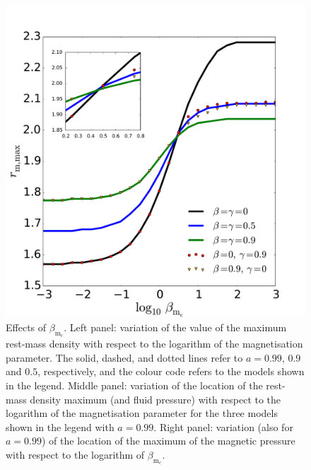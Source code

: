 \documentclass{aa}
\begin{document}
\begin{figure}
\hspace{-0.2cm}
\includegraphics[scale=0.14]{figures/fig6c.pdf}
\caption{Effects of $\beta_{\mathrm{m}_{\mathrm{c}}}$. Left panel: variation of the value of the maximum rest-mass density with respect to the logarithm of the magnetisation parameter. The solid, dashed, and dotted lines refer to $a = 0.99$, $0.9$ and $0.5$, respectively, and the colour code refers to the models shown in the legend. Middle panel: variation of the location of the rest-mass density maximum (and fluid pressure) with respect to the logarithm of the magnetisation parameter for the three models shown in the legend with $a = 0.99$. Right panel: variation (also for $a = 0.99$) of the location of the maximum of the magnetic pressure with respect to the logarithm of $\beta_{\mathrm{m}_{\mathrm{c}}}$.}
           \label{max-vs-magnetisation}%
 \end{figure}
 
\end{document}
